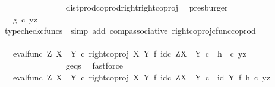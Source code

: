 \begin{isabellebody}
\ \ \ \ \ \ \ \ \ \ \ \ \ \ \isamarkupfalse%
\ dist{\isacharunderscore}{\kern0pt}prod{\isacharunderscore}{\kern0pt}coprod{\isacharunderscore}{\kern0pt}right{\isacharunderscore}{\kern0pt}right{\isacharunderscore}{\kern0pt}coproj\ \isamarkupfalse%
\ presburger\isanewline
\ \ \ \ \ \ \ \ \ \ \ \ \isamarkupfalse%
\ \isamarkupfalse%
\ {\isachardoublequoteopen}{\isachardot}{\kern0pt}{\isachardot}{\kern0pt}{\isachardot}{\kern0pt}\ {\isacharequal}{\kern0pt}\ g\isactrlsup {\isasymflat}\ {\isasymcirc}\isactrlsub c\ {\isasymlangle}y{\isacharcomma}{\kern0pt}z{\isasymrangle}{\isachardoublequoteclose}\isanewline
\ \ \ \ \ \ \ \ \ \ \ \ \ \ \isamarkupfalse%
\ {\isacharparenleft}{\kern0pt}typecheck{\isacharunderscore}{\kern0pt}cfuncs{\isacharcomma}{\kern0pt}\ \ simp\ add{\isacharcolon}{\kern0pt}\ comp{\isacharunderscore}{\kern0pt}associative{}\ right{\isacharunderscore}{\kern0pt}coproj{\isacharunderscore}{\kern0pt}cfunc{\isacharunderscore}{\kern0pt}coprod{\isacharparenright}{\kern0pt}\isanewline
\ \ \ \ \ \ \ \ \ \ \ \ \isamarkupfalse%
\ \isamarkupfalse%
\ {\isachardoublequoteopen}{\isachardot}{\kern0pt}{\isachardot}{\kern0pt}{\isachardot}{\kern0pt}\ {\isacharequal}{\kern0pt}\ {\isacharparenleft}{\kern0pt}{\isacharparenleft}{\kern0pt}eval{\isacharunderscore}{\kern0pt}func\ Z\ {\isacharparenleft}{\kern0pt}X\ {\isasymCoprod}\ Y{\isacharparenright}{\kern0pt}\ {\isasymcirc}\isactrlsub c\ right{\isacharunderscore}{\kern0pt}coproj\ X\ Y\ {\isasymtimes}\isactrlsub f\ id\isactrlsub c\ {\isacharparenleft}{\kern0pt}Z\isactrlbsup {\isacharparenleft}{\kern0pt}X\ {\isasymCoprod}\ Y{\isacharparenright}{\kern0pt}\isactrlesup {\isacharparenright}{\kern0pt}{\isacharparenright}{\kern0pt}\isactrlsup {\isasymsharp}\ {\isasymcirc}\isactrlsub c\ \ h{\isacharparenright}{\kern0pt}\isactrlsup {\isasymflat}\ \ {\isasymcirc}\isactrlsub c\ {\isasymlangle}y{\isacharcomma}{\kern0pt}z{\isasymrangle}{\isachardoublequoteclose}\isanewline
\ \ \ \ \ \ \ \ \ \ \ \ \ \ \isamarkupfalse%
\ g{\isacharunderscore}{\kern0pt}eqs\ \isamarkupfalse%
\ fastforce\isanewline
\ \ \ \ \ \ \ \ \ \ \ \ \isamarkupfalse%
\ \isamarkupfalse%
\ {\isachardoublequoteopen}{\isachardot}{\kern0pt}{\isachardot}{\kern0pt}{\isachardot}{\kern0pt}\ {\isacharequal}{\kern0pt}\ {\isacharparenleft}{\kern0pt}{\isacharparenleft}{\kern0pt}{\isacharparenleft}{\kern0pt}eval{\isacharunderscore}{\kern0pt}func\ Z\ {\isacharparenleft}{\kern0pt}X\ {\isasymCoprod}\ Y{\isacharparenright}{\kern0pt}\ {\isasymcirc}\isactrlsub c\ right{\isacharunderscore}{\kern0pt}coproj\ X\ Y\ {\isasymtimes}\isactrlsub f\ id\isactrlsub c\ {\isacharparenleft}{\kern0pt}Z\isactrlbsup {\isacharparenleft}{\kern0pt}X\ {\isasymCoprod}\ Y{\isacharparenright}{\kern0pt}\isactrlesup {\isacharparenright}{\kern0pt}{\isacharparenright}{\kern0pt}\isactrlsup {\isasymsharp}\isactrlsup {\isasymflat}{\isacharparenright}{\kern0pt}\ {\isasymcirc}\isactrlsub c\ \ {\isacharparenleft}{\kern0pt}id\ Y\ {\isasymtimes}\isactrlsub f\ h{\isacharparenright}{\kern0pt}{\isacharparenright}{\kern0pt}\ {\isasymcirc}\isactrlsub c\ {\isasymlangle}y{\isacharcomma}{\kern0pt}z{\isasymrangle}{\isachardoublequoteclose}\isanewline

\end{isabellebody}
